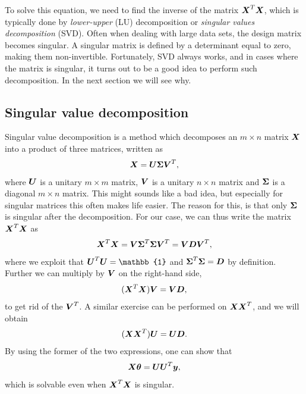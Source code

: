 To solve this equation, we need to find the inverse of the matrix $\boldsymbol{{X}}^T\boldsymbol{{X}}$, which is typically done by \textit{lower-upper} (LU) decomposition or \textit{singular values decomposition} (SVD). Often when dealing with large data sets, the design matrix becomes singular. A singular matrix is defined by a determinant equal to zero, making them non-invertible. Fortunately, SVD always works, and in cases where the matrix is singular, it turns out to be a good idea to perform such decomposition. In the next section we will see why.

\subsection{Singular value decomposition}
Singular value decomposition is a method which decomposes an $m\times n$ matrix $\boldsymbol{{X}}$ into a product of three matrices, written as
\begin{equation}
\boldsymbol{{X}}=\boldsymbol{{U}}\boldsymbol{{\Sigma}}\boldsymbol{{V}}^T,
\end{equation}
where $\boldsymbol{{U}}$ is a unitary $m\times m$ matrix, $\boldsymbol{{V}}$ is a unitary $n\times n$ matrix and $\boldsymbol{{\Sigma}}$ is a diagonal $m\times n$ matrix. This might sounds like a bad idea, but especially for singular matrices this often makes life easier. The reason for this, is that only $\boldsymbol{{\Sigma}}$ is singular after the decomposition. For our case, we can thus write the matrix $\boldsymbol{{X}}^T\boldsymbol{{X}}$ as 
\begin{equation}
\boldsymbol{{X}}^T\boldsymbol{{X}}=\boldsymbol{{V}}\boldsymbol{{\Sigma}}^T\boldsymbol{{\Sigma}}\boldsymbol{{V}}^T=\boldsymbol{{V}}\boldsymbol{{D}}\boldsymbol{{V}}^T,
\end{equation}
where we exploit that $\bs{U}^T\bs{U}=\mathbb{1}$ and $\boldsymbol{{\Sigma}}^T\boldsymbol{{\Sigma}}=\boldsymbol{{D}}$ by definition. Further we can multiply by $\boldsymbol{{V}}$ on the right-hand side,
\begin{equation}
(\boldsymbol{{X}}^T\boldsymbol{{X}})\boldsymbol{{V}}=\boldsymbol{{V}}\boldsymbol{{D}},
\end{equation}
to get rid of the $\boldsymbol{{V}}^T$. A similar exercise can be performed on $\boldsymbol{{X}}\boldsymbol{{X}}^T$, and we will obtain
\begin{equation}
(\boldsymbol{{X}}\boldsymbol{{X}}^T)\boldsymbol{{U}}=\boldsymbol{{U}}\boldsymbol{{D}}.
\end{equation}
By using the former of the two expressions, one can show that
\begin{equation}
\boldsymbol{{X}}\boldsymbol{{\theta}}=\boldsymbol{{U}}\boldsymbol{{U}}^T\boldsymbol{{y}},
\end{equation}
which is solvable even when $\boldsymbol{{X}}^T\boldsymbol{{X}}$ is singular.

